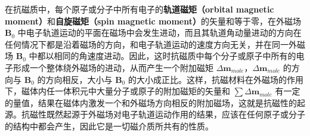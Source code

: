 
\begin{issues}
\issueDraft
{}
\end{issues}

在抗磁质中，每个原子或分子中所有电子的\textbf{轨道磁矩（orbital magnetic moment）}和\textbf{自旋磁矩（spin magnetic moment）}的矢量和等于零，在外磁场 $\mathbf B_0$ 中电子轨道运动的平面在磁场中会发生进动，而且其轨道角动量进动的方向在任何情况下都是沿着磁场的方向，和电子轨道运动的速度方向无关，并在同一外磁场 $\mathbf B_0$ 中都以相同的角速度进动。因此，这时抗磁质中每个分子或原子中所有的电子形成一个整体绕外磁场的进动，从而产生一个附加磁矩 $\Delta\mathbf{m}_{mole}$，$\Delta\mathbf{m}_{mole}$ 的方向与 $\mathbf B_0$ 的方向相反，大小与 $\mathbf B_0$ 的大小成正比。这样，抗磁材料在外磁场的作用下，磁体内任一体积元中大量分子或原子的附加磁矩的矢量和 $\sum \Delta\mathbf{m}_{mole}$ 有一定的量值，结果在磁体内激发一个和外磁场方向相反的附加磁场，这就是抗磁性的起源。抗磁性既然起源于外磁场对电子轨道运动作用的结果，应该在任何原子或分子的结构中都会产生，因此它是一切磁介质所共有的性质。

